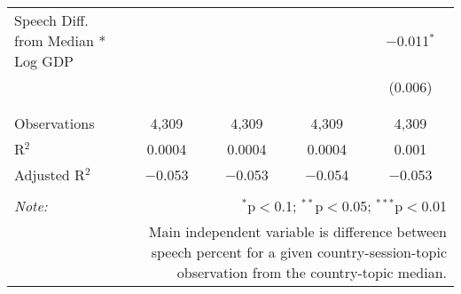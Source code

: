 \begin{table}[!htbp]
\begin{tabular}{@{\extracolsep{5pt}}lcccc}
 Speech Diff. from Median * Log GDP &  &  &  & $-$0.011$^{*}$ \\ 
  &  &  &  & (0.006) \\ 
  & & & & \\ 
\hline \\[-1.8ex] 
Observations & 4,309 & 4,309 & 4,309 & 4,309 \\ 
R$^{2}$ & 0.0004 & 0.0004 & 0.0004 & 0.001 \\ 
Adjusted R$^{2}$ & $-$0.053 & $-$0.053 & $-$0.054 & $-$0.053 \\ 
\hline 
\hline \\[-1.8ex] 
\textit{Note:}  & \multicolumn{4}{r}{$^{*}$p$<$0.1; $^{**}$p$<$0.05; $^{***}$p$<$0.01} \\ 
 & \multicolumn{4}{r}{Main independent variable is difference between speech percent for a given country-session-topic observation from the country-topic median.} \\ 
\end{tabular} 
\end{table} 

